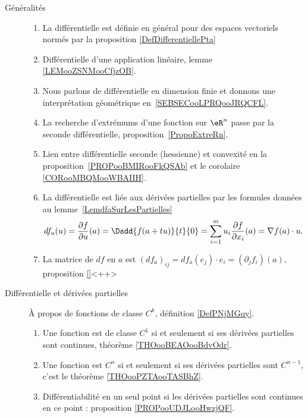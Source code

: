 \begin{description}
	\item[Généralités]
		\begin{enumerate}
			\item
			      La différentielle est définie en général pour des espaces vectoriels normés par la proposition \ref{DefDifferentiellePta}
			\item
			      Différentielle d'une application linéaire, lemme \ref{LEMooZSNMooCfjzOB}.
			\item
			      Nous parlons de différentielle en dimension finie et donnons une interprétation géométrique en~\ref{SEBSECooLPRQooJRQCFL}.
			\item
			      La recherche d'extrémums d'une fonction sur \( \eR^n\) passe par la seconde différentielle, proposition~\ref{PropoExtreRn}.
			\item
			      Lien entre différentielle seconde (hessienne) et convexité en la proposition~\ref{PROPooBMIRooFkQSAb} et le corolaire \ref{CORooMBQMooWBAIIH}.
			\item
			      La différentielle est liée aux dérivées partielles par les formules données au lemme~\ref{LemdfaSurLesPartielles}
			      \begin{equation}
				      df_a(u)=\frac{ \partial f }{ \partial u }(a)=\Dsdd{ f(a+tu) }{t}{0}=\sum_{i=1}^mu_i\frac{ \partial f }{ \partial x_i }(a)=\nabla f(a)\cdot u.
			      \end{equation}
			\item
			      La matrice de \( df\) en \( a\) est \( (df_a)_{ij}=df_a(e_j)\cdot e_i=(\partial_jf_i)(a)\), proposition \ref{}<++>
		\end{enumerate}
	\item[Différentielle et dérivées partielles]
		À propos de fonctions de classe \( C^k\), définition \ref{DefPNjMGqy}.
		\begin{enumerate}
			\item
			      Une fonction est de classe \( C^1\) si et seulement si ses dérivées partielles sont continues, théorème \ref{THOooBEAOooBdvOdr}.
			\item
			      Une fonction est \( C^n\) si et seulement si ses dérivées partielles sont \( C^{n-1}\), c'est le théorème \ref{THOooPZTAooTASBhZ}.
			\item
			      Différentiabilité en un seul point si les dérivées partielles sont continues en ce point : proposition \ref{PROPooUDJLooHwzjQF}.
		\end{enumerate}

\end{description}
